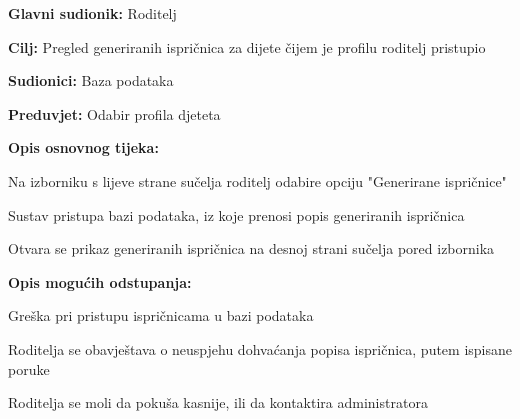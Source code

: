 					\noindent {}
					\begin{packed_item}
						
						\item \textbf{Glavni sudionik: }Roditelj
						\item  \textbf{Cilj:} Pregled generiranih ispričnica za dijete čijem je profilu roditelj pristupio
						\item  \textbf{Sudionici:} Baza podataka
						\item  \textbf{Preduvjet:} Odabir profila djeteta
						\item  \textbf{Opis osnovnog tijeka:}
						
						\item[] \begin{packed_enum}
							
							\item Na izborniku s lijeve strane sučelja roditelj odabire opciju "Generirane ispričnice"
							\item Sustav pristupa bazi podataka, iz koje prenosi popis generiranih ispričnica
							\item Otvara se prikaz generiranih ispričnica na desnoj strani sučelja pored izbornika
						\end{packed_enum}
						\item  \textbf{Opis mogućih odstupanja:}
						\item[] \begin{packed_item}
							
							\item[2.a] Greška pri pristupu ispričnicama u bazi podataka
							\item[] \begin{packed_enum}
								
								\item Roditelja se obavještava o neuspjehu dohvaćanja popisa ispričnica, putem ispisane poruke
								\item Roditelja se moli da pokuša kasnije, ili da kontaktira administratora
								
							\end{packed_enum}
						\end{packed_item}
					\end{packed_item}
					
